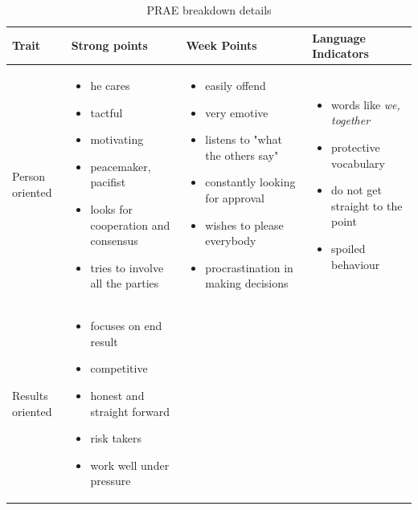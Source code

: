 \begin{table}[h]
  \centering
  \caption{PRAE breakdown details}
    \begin{tabular}{p{}p{}p{}p{}}
    \toprule
    Trait & Strong points & Week Points & Language Indicators \\ \midrule
    
    Person oriented 
     &
      \begin{itemize}
      \item he cares
      \item tactful
      \item motivating
      \item peacemaker, pacifist
      \item looks for cooperation and consensus
      \item tries to involve all the parties
      \end{itemize}
     & 
      \begin{itemize}
      \item easily offend
      \item very emotive
      \item listens to "what the others say"
      \item constantly looking for approval
      \item wishes to please everybody
      \item procrastination in making decisions
      \end{itemize}
     & 
      \begin{itemize}
      \item words like \textit{we, together}
      \item protective vocabulary
      \item do not get straight to the point
      \item spoiled behaviour
      \end{itemize}
     \\ \midrule
    Results oriented
     &
      \begin{itemize}
       \item focuses on end result
       \item competitive
       \item honest and straight forward
       \item risk takers
       \item work well under pressure
      \end{itemize}
     &

\end{tabular}
\end{table}
